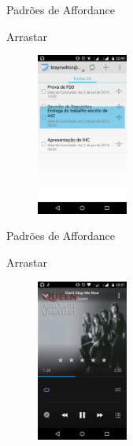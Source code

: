 \begin{frame}{Padrões de Affordance}
\begin{block}{Arrastar}
    \begin{figure}
    \includegraphics[width=3cm]{figuras/arrast/arrast3}
    \end{figure}
\end{block}
\end{frame}

\begin{frame}{Padrões de Affordance}
\begin{block}{Arrastar}
    \begin{figure}
    \includegraphics[width=3cm]{figuras/arrast/arrast2}
    \end{figure}
\end{block}
\end{frame}
